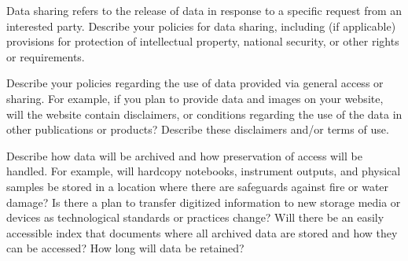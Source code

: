 Data sharing refers to the release of data in response to a specific request from an interested party. 
Describe your policies for data sharing, including (if applicable) provisions for protection of intellectual property, national security, or other rights or requirements. 
 
\bigskip
{}
 
\noindent Describe your policies regarding the use of data provided via general access or sharing. For example, if you plan to provide data and images on your website, will the website contain disclaimers, or conditions regarding the use of the data in other publications or products? Describe these disclaimers and/or terms of use. 
 
 
\bigskip
{}
 
\noindent Describe how data will be archived and how preservation of access will be handled. For example, will hardcopy notebooks, instrument outputs, and physical samples be stored in a location where there are safeguards against fire or water damage? Is there a plan to transfer digitized information to new storage media or devices as technological standards or practices change? Will there be an easily accessible index that documents where all archived data are stored and how they can be accessed? How long will data be retained?
